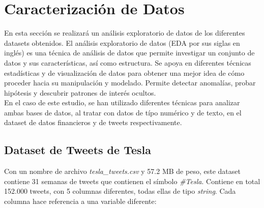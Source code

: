 \documentclass[a4paper, 12pt]{report}
\begin{document}
        \section{Caracterización de Datos}

                En esta sección se realizará un análisis exploratorio de datos de los diferentes datasets obtenidos.
                El análisis exploratorio de datos (EDA por sus siglas en inglés) es una técnica de análisis de datos que permite investigar un conjunto de datos y sus características, así como estructura.
                Se apoya en diferentes técnicas estadísticas y de visualización de datos para obtener una mejor idea de cómo proceder hacia su manipulación y modelado. Permite detectar anomalías, probar
                hipótesis y descubrir patrones de interés ocultos. \\

                En el caso de este estudio, se han utilizado diferentes técnicas para analizar ambas bases de datos, al tratar con datos de típo numérico y de texto, en el dataset de 
                datos financieros y de tweets respectivamente.\\
                
                \subsection{Dataset de Tweets de Tesla}
                        Con un nombre de archivo \textit{ tesla\_tweets.csv } y 57.2 MB de peso, este dataset contiene 31 semanas de tweets que contienen el símbolo \textit{\#Tesla}.
                        Contiene en total 152.000 tweets, con 5 columnas diferentes, todas ellas de tipo \textit{string}. Cada columna hace referencia a una variable diferente:\\
\end{document}
